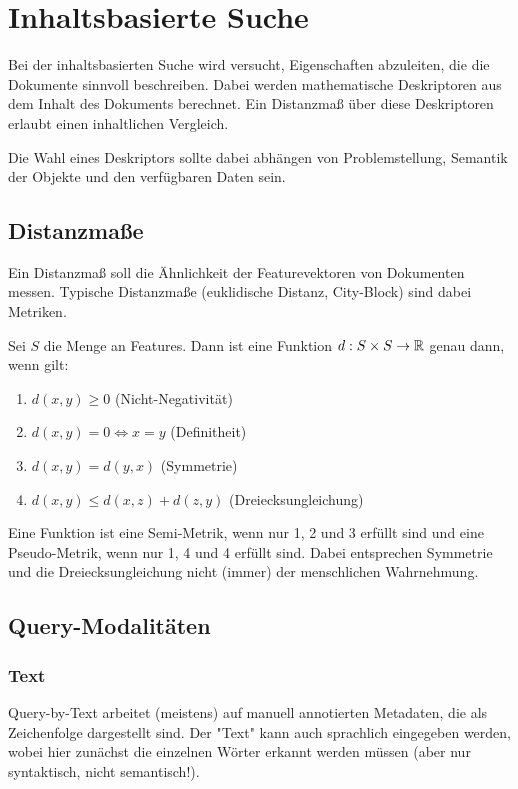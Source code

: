 	\section{Inhaltsbasierte Suche}
		Bei der inhaltsbasierten Suche wird versucht, Eigenschaften abzuleiten, die die Dokumente sinnvoll beschreiben. Dabei werden mathematische Deskriptoren aus dem Inhalt des Dokuments berechnet. Ein Distanzmaß über diese Deskriptoren erlaubt einen inhaltlichen Vergleich.
		
		Die Wahl eines Deskriptors sollte dabei abhängen von Problemstellung, Semantik der Objekte und den verfügbaren Daten sein.

		\subsection{Distanzmaße}
			Ein Distanzmaß soll die Ähnlichkeit der Featurevektoren von Dokumenten messen. Typische Distanzmaße (euklidische Distanz, City-Block) sind dabei Metriken.
			
			Sei \(S\) die Menge an Features. Dann ist eine Funktion \( d : S \times S \to \mathbb{R} \) genau dann, wenn gilt:
			\begin{enumerate}
				\item \( d(x, y) \geq 0 \) (Nicht-Negativität)
				\item \( d(x, y) = 0 \iff x = y \) (Definitheit)
				\item \( d(x, y) = d(y, x) \) (Symmetrie)
				\item \( d(x, y) \leq d(x, z) + d(z, y) \) (Dreiecksungleichung)
			\end{enumerate}
			Eine Funktion ist eine Semi-Metrik, wenn nur 1, 2 und 3 erfüllt sind und eine Pseudo-Metrik, wenn nur 1, 4 und 4 erfüllt sind. Dabei entsprechen Symmetrie und die Dreiecksungleichung nicht (immer) der menschlichen Wahrnehmung.

		\subsection{Query-Modalitäten}
			\subsubsection{Text} 
				Query-by-Text arbeitet (meistens) auf manuell annotierten Metadaten, die als Zeichenfolge dargestellt sind. Der "Text" kann auch sprachlich eingegeben werden, wobei hier zunächst die einzelnen Wörter erkannt werden müssen (aber nur syntaktisch, nicht semantisch!).

